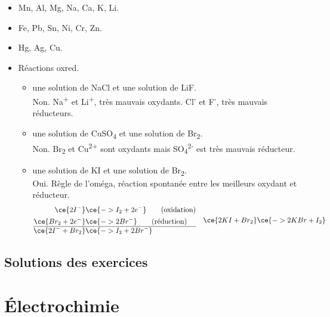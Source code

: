 \documentclass[
  11pt,
  a4paper,
  openany]{book}
\providecommand{\tightlist}{%
  \setlength{\itemsep}{0pt}\setlength{\parskip}{0pt}}
\begin{document}
\begin{Answer}

\begin{itemize}
\tightlist
\item
  Mn, Al, Mg, Na, Ca, K, Li.
\item
  Fe, Pb, Sn, Ni, Cr, Zn.
\item
  Hg, Ag, Cu.
\item
  Réactions oxred.

  \begin{itemize}
  \tightlist
  \item
    une solution de NaCl et une solution de LiF.\\
    Non. Na\textsuperscript{+} et Li\textsuperscript{+}, très mauvais oxydants. Cl\textsuperscript{-} et F\textsuperscript{-}, très mauvais réducteurs.
  \item
    une solution de CuSO\textsubscript{4} et une solution de Br\textsubscript{2}.\\
    Non. Br\textsubscript{2} et Cu\textsuperscript{2+} sont oxydants mais SO\textsubscript{4}\textsuperscript{2-} est très mauvais réducteur.
  \item
    une solution de KI et une solution de Br\textsubscript{2}.\\
    Oui. Règle de l'oméga, réaction spontanée entre les meilleurs oxydant et réducteur.\\
    \[
      \begin{split}
      \ce{2I^{-}} & \ce{ -> I_2 + 2 e^-} \qquad \text{(oxidation)} \\
      \ce{Br_{2} + 2 e^-} & \ce{ -> 2Br^{-}} \qquad \text{(réduction)} \\
      \hline
      \ce{2I^{-} + Br_{2}} & \ce{ -> I_{2} + 2Br^{-}}
      \end{split}
      \quad
      \begin{split}
      \ce{2KI + Br_{2}} & \ce{ -> 2KBr + I_{2}}
      \end{split}
      \]
  \end{itemize}
\end{itemize}

\end{Answer}

\newpage

\section{Solutions des exercices} \shipoutAnswer

\chapter{Électrochimie}\label{uxe9lectrochimie}
\end{document}
